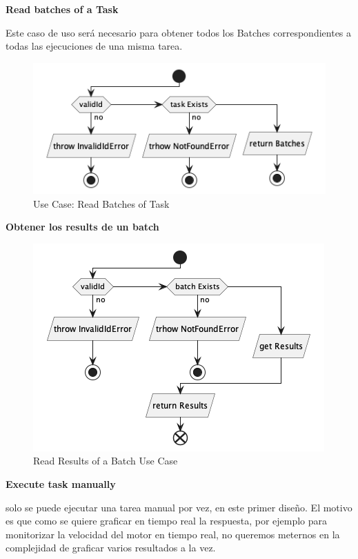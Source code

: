 \textbf{Read batches of a Task}

Este caso de uso será necesario para obtener todos los Batches correspondientes a todas las ejecuciones de una misma tarea.

\begin{figure}[H]
    \centering
    \includegraphics[height=0.2\textheight]{./part/Proyecto_ejecutivo/memoria_descriptiva/descripcionDelProyecto/manager/uml/getTaskBatchUseCase}
    \caption{Use Case: Read Batches of Task}\label{fig:Use Case-Read Batches of Task}
\end{figure}

\textbf{Obtener los results de un batch}

\begin{figure}[H]
    \centering
    \includegraphics[height=0.2\textheight]{./part/Proyecto_ejecutivo/memoria_descriptiva/descripcionDelProyecto/manager/uml/getBatchResultsUseCase}
    \caption{Read Results of a Batch Use Case}\label{fig:Read Results of a Batch Use Case}
\end{figure}

\textbf{Execute task manually}

solo se puede ejecutar una tarea manual por vez, en este primer diseño. El motivo es que como se quiere graficar en tiempo real la respuesta, por ejemplo para monitorizar la velocidad del motor en tiempo real, no queremos meternos en la complejidad de graficar varios resultados a la vez.

